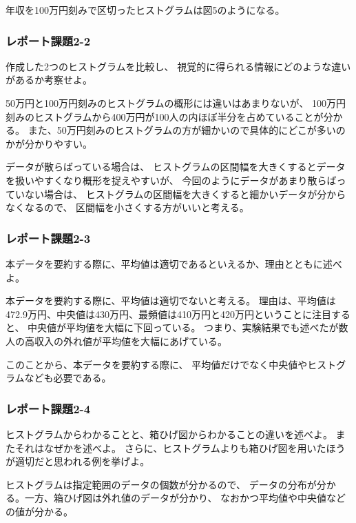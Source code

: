 \documentclass[12pt]{jarticle}
\begin{document}
年収を100万円刻みで区切ったヒストグラムは図5のようになる。

\clearpage
\subsubsection*{レポート課題2-2}
\begin{shadebox}
    作成した2つのヒストグラムを比較し、
    視覚的に得られる情報にどのような違いがあるか考察せよ。
\end{shadebox}

50万円と100万円刻みのヒストグラムの概形には違いはあまりないが、
100万円刻みのヒストグラムから400万円が100人の内ほぼ半分を占めていることが分かる。
また、50万円刻みのヒストグラムの方が細かいので具体的にどこが多いのかが分かりやすい。

データが散らばっている場合は、
ヒストグラムの区間幅を大きくするとデータを扱いやすくなり概形を捉えやすいが、
今回のようにデータがあまり散らばっていない場合は、
ヒストグラムの区間幅を大きくすると細かいデータが分からなくなるので、
区間幅を小さくする方がいいと考える。

\subsubsection*{レポート課題2-3}
\begin{shadebox}
    本データを要約する際に、平均値は適切であるといえるか、理由とともに述べよ。
\end{shadebox}

本データを要約する際に、平均値は適切でないと考える。
理由は、平均値は472.9万円、中央値は430万円、最頻値は410万円と420万円ということに注目すると、
中央値が平均値を大幅に下回っている。
つまり、実験結果でも述べたが数人の高収入の外れ値が平均値を大幅にあげている。

このことから、本データを要約する際に、
平均値だけでなく中央値やヒストグラムなども必要である。

\subsubsection*{レポート課題2-4}
\begin{shadebox}
    ヒストグラムからわかることと、箱ひげ図からわかることの違いを述べよ。
    またそれはなぜかを述べよ。
    さらに、ヒストグラムよりも箱ひげ図を用いたほうが適切だと思われる例を挙げよ。
\end{shadebox}

ヒストグラムは指定範囲のデータの個数が分かるので、
データの分布が分かる。一方、箱ひげ図は外れ値のデータが分かり、
なおかつ平均値や中央値などの値が分かる。
\end{document}
